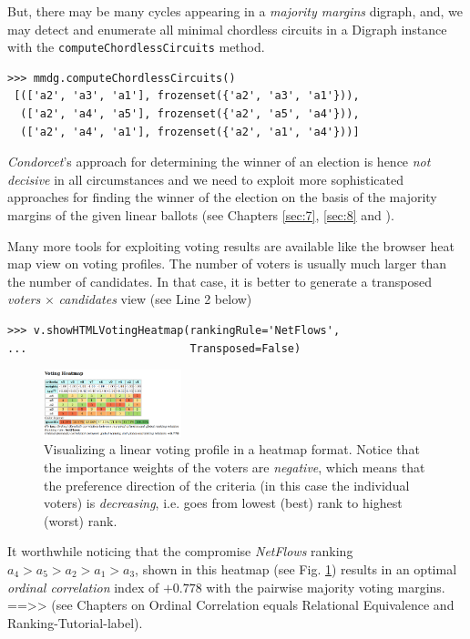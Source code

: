 But, there may be many cycles appearing in a \emph{majority margins} digraph, and, we may detect and enumerate all minimal chordless circuits in a Digraph instance with the \texttt{computeChordlessCircuits} method.

\begin{lstlisting}[basicstyle=\footnotesize]
>>> mmdg.computeChordlessCircuits()
 [(['a2', 'a3', 'a1'], frozenset({'a2', 'a3', 'a1'})), 
  (['a2', 'a4', 'a5'], frozenset({'a2', 'a5', 'a4'})), 
  (['a2', 'a4', 'a1'], frozenset({'a2', 'a1', 'a4'}))]
\end{lstlisting}

\emph{Condorcet}'s approach for determining the winner of an election is hence \emph{not decisive} in all circumstances and we need to exploit more sophisticated approaches for finding the winner of the election on the basis of the majority margins of the given linear ballots (see Chapters \ref{sec:7}, \ref{sec:8} and \citet{BIS-2008a}). 

Many more tools for exploiting voting results are available like the browser heat map view on voting profiles. The number of voters is usually much larger than the number of candidates. In that case, it is better to generate a transposed \emph{voters} $\times$ \emph{candidates} view (see Line 2 below) 

\begin{lstlisting}[basicstyle=\footnotesize]
>>> v.showHTMLVotingHeatmap(rankingRule='NetFlows',
...                         Transposed=False)
\end{lstlisting}

\begin{figure}[h]
\sidecaption
\includegraphics[width=4cm]{Figures/votingHeatmap.png}
\caption{Visualizing a linear voting profile in a heatmap format. Notice that the importance weights of the voters are \emph{negative}, which means that the preference direction of the criteria (in this case the individual voters) is \emph{decreasing}, i.e. goes from lowest (best) rank to highest (worst) rank.
}
\label{fig:7.3}       %
\end{figure}

It worthwhile noticing that the compromise \emph{NetFlows} ranking $a_4 > a_5 > a_2 > a_1 > a_3$, shown in this heatmap (see Fig. \ref{fig:7.3}) results in an optimal \emph{ordinal correlation} index of $+0.778$ with the pairwise majority voting margins.
==>> (see Chapters on Ordinal Correlation equals Relational Equivalence and Ranking-Tutorial-label). 

